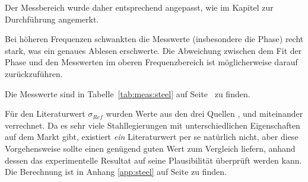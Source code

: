 {\begin{minipage}[t]{0.33\textwidth}
        Der Messbereich wurde daher entsprechend angepasst, wie im Kapitel zur
        Durchf\"uhrung angemerkt.

        Bei  h\"oheren  Frequenzen   schwankten  die  Messwerte  (insbesondere
        die  Phase)  recht  stark,  was ein  genaues  Ablesen  erschwerte. Die
        Abweichung zwischen  dem Fit  der Phase und  den Messwerten  im oberen
        Frequenzbereich ist m\"oglicherweise darauf zur\"uckzuf\"uhren.

        Die    Messwerte    sind     in    Tabelle~\ref{tab:meas:steel}    auf
        Seite~\pageref{tab:meas:steel} zu finden.

        F\"ur     den     Literaturwert    $\sigma_{Ref}$     wurden     Werte
        aus     den    drei     Quellen    \cite{ref:stainless:hypertextbook},
        \cite{ref:stainless:aksteel}    und    \cite{ref:stainless:stahlwerke}
        miteinander   verrechnet. Da  es   sehr  viele   Stahllegierungen  mit
        unterschiedlichen   Eigenschaften  auf   dem  Markt   gibt,  existiert
        \emph{ein}  Literaturwert   per  se  nat\"urlich  nicht,   aber  diese
        Vorgehensweise  sollte  einen  gen\"ugend  guten  Wert  zum  Vergleich
        liefern,  anhand   dessen  das   experimentelle  Resultat   auf  seine
        Plausibilit\"at  \"uberpr\"uft  werden  kann. Die  Berechnung  ist  in
        Anhang \ref{app:steel} auf Seite \pageref{app:steel} zu finden.


\end{minipage}}

